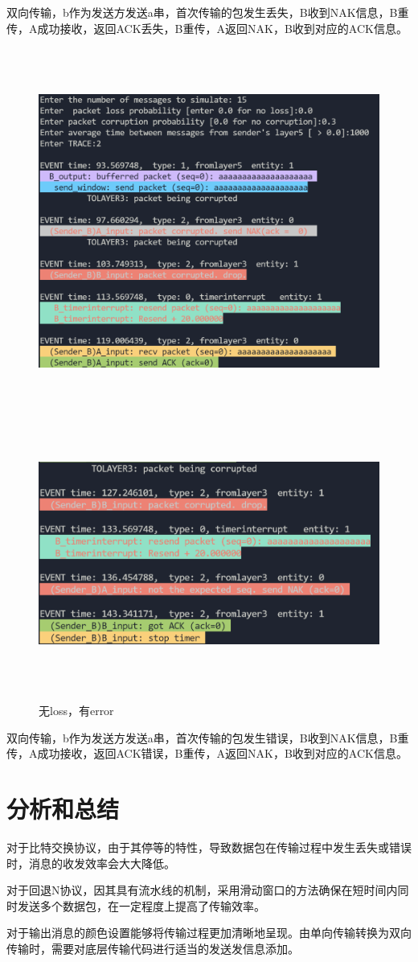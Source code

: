 \documentclass[UTF8,14pt]{article}
\numberwithin{figure}{section}
\begin{document}
双向传输，b作为发送方发送a串，首次传输的包发生丢失，B收到NAK信息，B重传，A成功接收，返回ACK丢失，B重传，A返回NAK，B收到对应的ACK信息。
\newpage
\begin{figure}[!htbp]
      \centering
      \setlength{\abovecaptionskip}{0.cm}
      \includegraphics[width=15cm,height=12.06cm]{figures/gbn2_1.png}
      \includegraphics[width=15cm,height=8.89cm]{figures/gbn2_2.png}
      \caption{无loss，有error}
\end{figure}

双向传输，b作为发送方发送a串，首次传输的包发生错误，B收到NAK信息，B重传，A成功接收，返回ACK错误，B重传，A返回NAK，B收到对应的ACK信息。
\newpage
\section{分析和总结}
对于比特交换协议，由于其停等的特性，导致数据包在传输过程中发生丢失或错误时，消息的收发效率会大大降低。

对于回退N协议，因其具有流水线的机制，采用滑动窗口的方法确保在短时间内同时发送多个数据包，在一定程度上提高了传输效率。

对于输出消息的颜色设置能够将传输过程更加清晰地呈现。由单向传输转换为双向传输时，需要对底层传输代码进行适当的发送发信息添加。
\end{document}

